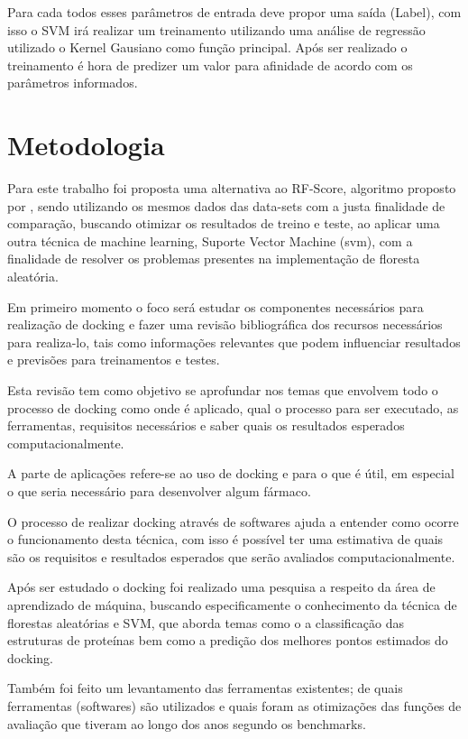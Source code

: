 \documentclass[tcc, capa]{texucpel}
\begin{document}
Para cada todos esses parâmetros de entrada deve propor uma saída (Label),  com isso o SVM irá realizar um treinamento utilizando uma análise de regressão utilizado o Kernel Gausiano como função principal.
Após ser realizado o treinamento é hora de predizer um valor para afinidade de acordo com os parâmetros informados.

\chapter{Metodologia}
Para este trabalho foi proposta uma alternativa ao RF-Score, algoritmo proposto por \cite{ballester2010machine}, sendo utilizando os mesmos dados das data-sets com a justa finalidade de comparação, buscando otimizar os resultados  de treino e teste, ao aplicar uma outra técnica de machine learning, Suporte Vector Machine (svm), com a finalidade de resolver os problemas presentes na implementação de floresta aleatória.

Em primeiro momento o foco será estudar os componentes necessários para realização de docking e  fazer uma revisão bibliográfica dos recursos necessários para realiza-lo, tais como informações relevantes que podem influenciar resultados e previsões para treinamentos e testes. 

Esta revisão tem como objetivo se aprofundar nos temas que envolvem todo o processo de docking como onde é aplicado, qual o processo para ser executado, as ferramentas, requisitos necessários  e saber quais os resultados esperados computacionalmente.

A parte de aplicações refere-se ao uso de docking e para o que é útil,  em especial o que seria necessário para desenvolver algum fármaco.

O processo de realizar docking através de softwares ajuda a entender como ocorre o funcionamento desta técnica, com isso é possível ter uma estimativa de quais são os requisitos e resultados esperados que serão avaliados computacionalmente.

Após ser estudado o docking foi realizado uma pesquisa a respeito da área de aprendizado de máquina, buscando especificamente o conhecimento da técnica de florestas aleatórias e SVM, que aborda temas como o a classificação das estruturas de proteínas bem como a predição dos melhores pontos estimados do docking.

Também foi feito um levantamento das ferramentas existentes; de quais ferramentas (softwares) são utilizados e quais foram as otimizações das funções de avaliação que tiveram ao longo dos anos segundo os benchmarks.
\end{document}
